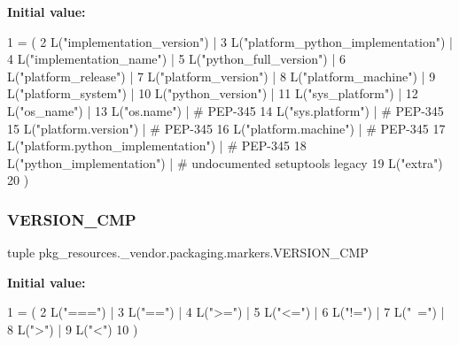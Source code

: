 {\bfseries Initial value\+:}
\begin{DoxyCode}
1 =  (
2     L(\textcolor{stringliteral}{"implementation\_version"}) |
3     L(\textcolor{stringliteral}{"platform\_python\_implementation"}) |
4     L(\textcolor{stringliteral}{"implementation\_name"}) |
5     L(\textcolor{stringliteral}{"python\_full\_version"}) |
6     L(\textcolor{stringliteral}{"platform\_release"}) |
7     L(\textcolor{stringliteral}{"platform\_version"}) |
8     L(\textcolor{stringliteral}{"platform\_machine"}) |
9     L(\textcolor{stringliteral}{"platform\_system"}) |
10     L(\textcolor{stringliteral}{"python\_version"}) |
11     L(\textcolor{stringliteral}{"sys\_platform"}) |
12     L(\textcolor{stringliteral}{"os\_name"}) |
13     L(\textcolor{stringliteral}{"os.name"}) |  \textcolor{comment}{# PEP-345}
14     L(\textcolor{stringliteral}{"sys.platform"}) |  \textcolor{comment}{# PEP-345}
15     L(\textcolor{stringliteral}{"platform.version"}) |  \textcolor{comment}{# PEP-345}
16     L(\textcolor{stringliteral}{"platform.machine"}) |  \textcolor{comment}{# PEP-345}
17     L(\textcolor{stringliteral}{"platform.python\_implementation"}) |  \textcolor{comment}{# PEP-345}
18     L(\textcolor{stringliteral}{"python\_implementation"}) |  \textcolor{comment}{# undocumented setuptools legacy}
19     L(\textcolor{stringliteral}{"extra"})
20 )
\end{DoxyCode}
\mbox{\label{namespacepkg__resources_1_1__vendor_1_1packaging_1_1markers_a45b81eb5b2865f57ac4b28aa1bb9289a}} 
\subsubsection{\texorpdfstring{V\+E\+R\+S\+I\+O\+N\+\_\+\+C\+MP}{VERSION\_CMP}}
{\footnotesize\ttfamily tuple pkg\+\_\+resources.\+\_\+vendor.\+packaging.\+markers.\+V\+E\+R\+S\+I\+O\+N\+\_\+\+C\+MP}

{\bfseries Initial value\+:}
\begin{DoxyCode}
1 =  (
2     L(\textcolor{stringliteral}{"==="}) |
3     L(\textcolor{stringliteral}{"=="}) |
4     L(\textcolor{stringliteral}{">="}) |
5     L(\textcolor{stringliteral}{"<="}) |
6     L(\textcolor{stringliteral}{"!="}) |
7     L(\textcolor{stringliteral}{"~="}) |
8     L(\textcolor{stringliteral}{">"}) |
9     L(\textcolor{stringliteral}{"<"})
10 )
\end{DoxyCode}
